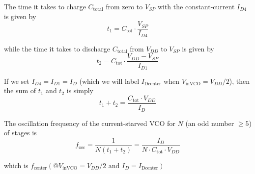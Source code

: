 \noindent The time it takes to charge $C_{\text{total}}$ from zero to $V_{SP}$ with the constant-current $I_{D4}$ is given by
\begin{equation}
t_1 = C_{\text{tot}} \cdot \frac{V_{SP}}{I_{D4}}
\tag{19.20}
\end{equation}

\noindent while the time it takes to discharge $C_{\text{total}}$ from $V_{DD}$ to $V_{SP}$ is given by
\begin{equation}
t_2 = C_{\text{tot}} \cdot \frac{V_{DD} - V_{SP}}{I_{D1}}
\tag{19.21}
\end{equation}

If we set $I_{D4} = I_{D1} = I_D$ (which we will label $I_{\text{Dcenter}}$ when $V_{\text{inVCO}} = V_{DD}/2$), then the sum of $t_1$ and $t_2$ is simply
\begin{equation}
t_1 + t_2 = \frac{C_{\text{tot}} \cdot V_{DD}}{I_D}
\tag{19.22}
\end{equation}

The oscillation frequency of the current-starved VCO for $N$ (an odd number $\geq 5$) of stages is
\begin{equation}
f_{\text{osc}} = \frac{1}{N(t_1 + t_2)} = \frac{I_D}{N \cdot C_{\text{tot}} \cdot V_{DD}}
\tag{19.23}
\end{equation}

which is $f_{\text{center}}(@ V_{\text{inVCO}} = V_{DD}/2 \text{ and } I_D = I_{\text{Dcenter}})$

